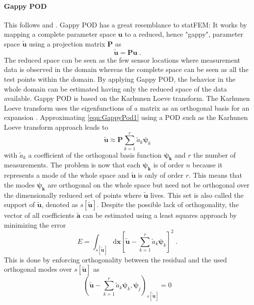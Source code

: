 \documentclass[%
  a4paper,oneside,%
  11pt,%
  smallchapters,
  style=printdev,
  extramargin,
  green,%
  rgb, <cmyk>
  ]{tubsbook}
\begin{document}
\paragraph{Gappy POD}
This follows \cite{Everson1995} and \cite{StevenL.Brunton2019}.
Gappy POD has a great resemblance to statFEM: It works by mapping a complete parameter space $\bm{u}$ to a reduced, hence "gappy", parameter space $\tilde{\bm{u}}$ using a projection matrix $\bm{P}$ as
\begin{equation}
\tilde{\bm{u}} = \bm{P} \bm{u}\;. 
\label{eqn:GappyPod1}
\end{equation}
The reduced space can be seen as the few sensor locations where measurement data is observed in the domain whereas the complete space can be seen as all the test points within the domain. By applying Gappy POD, the behavior in the whole domain can be estimated having only the reduced space of the data available. Gappy POD is based on the Karhunen Loeve transform. The Karhunen Loeve transform uses the eigenfunctions of a matrix as an orthogonal basis for an expansion \cite{Everson1995}.
Approximating \eqref{eqn:GappyPod1} using a POD such as the Karhunen Loeve transform approach leads to
\begin{equation}
\tilde{\bm{u}} \approx \bm{P} \sum_{k=1}^r \tilde{a}_k \bm{\psi}_k
\end{equation}
with $\tilde{a}_k$ a coefficient of the orthogonal basis function $\bm{\psi_k}$ and $r$ the number of measurements. The problem is now that each $\bm{\psi_k}$ is of order $n$ because it represents a mode of the whole space and $\tilde{\bm{u}}$ is only of order $r$. This means that the modes $\bm{\psi_k}$ are orthogonal on the whole space but need not be orthogonal over the dimensionally reduced set of points where $\tilde{\bm{u}}$ lives. This set is also called the support of $\tilde{\bm{u}}$, denoted as $s[\tilde{\bm{u}}]$. Despite the possible lack of orthogonality, the vector of all coefficients $\tilde{\bm{a}}$ can be estimated using a least squares approach by minimizing the error
\begin{equation}
E = \int_{s[\tilde{\bm{u}}]} \mathrm{d}\bm{x} \left[ \tilde{\bm{u}} - \sum_{k=1}^r \tilde{a}_k \bm{\psi}_k \right]^2	\;.
\end{equation}
This is done by enforcing orthogonality between the residual and the used orthogonal modes over $s[\tilde{\bm{u}}]$ as
\begin{equation}
\left( \tilde{\bm{u}} - \sum_{k=1}^r \tilde{a}_k \bm{\psi}_k, \bm{\psi}_j  \right)_{s[\tilde{\bm{u}}]} = 0
\end{equation}
\end{document}
